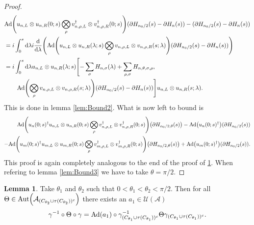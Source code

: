 \documentclass[12pt,a4paper,twoside]{article}
\renewcommand{\d}{\text{d}}
\let\originalleft\left
\let\originalright\right
\renewcommand{\left}{\mathopen{}\mathclose\bgroup\originalleft}
\renewcommand{\right}{\aftergroup\egroup\originalright}
\newcommand{\UU}{\mathcal U}
\renewcommand{\AA}{\mathcal A}
\newcommand{\Ad}[1]{\textrm{Ad}\left(#1\right)}
\newcommand{\Aut}[1]{\textrm{Aut}\left(#1\right)}
\theoremstyle{definition}
\newtheorem{lemma}[theorem]{Lemma}
\numberwithin{equation}{section}
\begin{document}
\begin{proof}
 	\begin{align}
 	&\Ad{u_{n,L}\otimes u_{n,R}(0;s) \bigotimes_\rho v_{n,\rho,L}^\dagger\otimes v_{n,\rho,R}^\dagger(0;s)}(\partial H_{n_0/2}(s)-\partial H_{n}(s))-(\partial H_{n_0/2}(s)-\partial H_{n}(s))\\
 	&=i\int_0^s\d \lambda i\frac{\d}{\d\lambda}\left(\Ad{u_{n,L}\otimes u_{n,R}(\lambda;s)\bigotimes_\rho v_{n,\rho,L}\otimes v_{n,\rho,R}(s;\lambda)}(\partial H_{n_0/2}(s)-\partial H_{n}(s))\right)\\
 	&=i\int_0^s \d\lambda u_{n,L}\otimes u_{n,R}(\lambda;s)\left[-\sum_\sigma H_{n,\sigma}(\lambda)+\sum_{\rho,\sigma} H_{n,\theta,\sigma,\rho},\right.\\
 	\nonumber
 	&\qquad\left.\Ad{\bigotimes_\rho v_{n,\rho,L}\otimes v_{n,\rho,R}(s;\lambda)}(\partial H_{n_0/2}(s)-\partial H_{n}(s))\right]u_{n,L}\otimes u_{n,R}(s;\lambda).
 	\end{align}
 	This is done in lemma \ref{lem:Bound2}. What is now left to bound is
 	\begin{align}
 		\nonumber
	 	\Ad{u_n(0;s)^\dagger u_{n,L}\otimes u_{n,R}(0;s) \bigotimes_\rho v_{n,\rho,L}^\dagger\otimes v_{n,\rho,R}^\dagger(0;s)}\left(\partial H_{n_0/2,\theta}(s)\right) - \Ad{u_n(0;s)^\dagger}(\partial H_{n_0/2}(s))\\
	 	-\Ad{u_m(0;s)^\dagger u_{m,L}\otimes u_{m,R}(0;s) \bigotimes_\rho v_{m,\rho,L}^\dagger\otimes v_{m,\rho,R}^\dagger(0;s)}\left(\partial H_{n_0/2,\theta}(s)\right) + \Ad{u_m(0;s)^\dagger}(\partial H_{n_0/2}(s)).
 	\end{align}
 	{\color{red}This proof is again completely analogous to the end of the proof of \ref{lem:TwoAngleLemmaPart1}. When refering to lemma \ref{lem:Bound3} we have to take $\theta=\pi/2$.}
 \end{proof}
\begin{lemma}\label{lem:TwoAngleLemmaPart1}
	Take $\theta_1$ and $\theta_2$ such that $0<\theta_1<\theta_2<\pi/2$. Then for all $\Theta\in\Aut{\AA_{(C_{\theta_2}\cup \tau(C_{\theta_2}))^c}}$ there exists an $a_1\in\UU(\AA)$
		\begin{equation}\label{eq:TwoAngleLemmaPart1Equation1}
			\gamma^{-1}\circ\Theta\circ\gamma=\Ad{a_1}\circ\gamma_{(C_{\theta_1}\cup \tau(C_{\theta_1}))^c}^{-1}\Theta\gamma_{(C_{\theta_1}\cup \tau(C_{\theta_1}))^c}.
		\end{equation}
\end{lemma}
\end{document}
